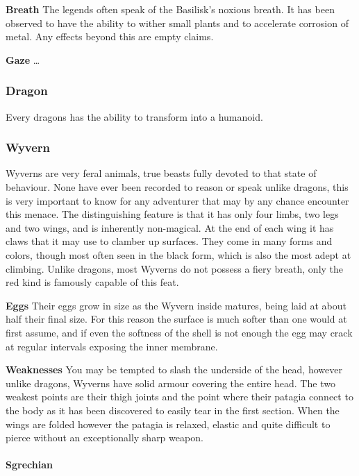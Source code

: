 \textbf{Breath} The legends often speak of the Basilisk's noxious
breath. It has been observed to have the ability to wither small plants
and to accelerate corrosion of metal. Any effects beyond this are empty
claims.

\textbf{Gaze} \ldots{}

\hypertarget{dragon}{%
\subsubsection{Dragon}\label{dragon}}

Every dragons has the ability to transform into a humanoid.

\hypertarget{wyvern}{%
\subsubsection{Wyvern}\label{wyvern}}

Wyverns are very feral animals, true beasts fully devoted to that state
of behaviour. None have ever been recorded to reason or speak unlike
dragons, this is very important to know for any adventurer that may by
any chance encounter this menace. The distinguishing feature is that it
has only four limbs, two legs and two wings, and is inherently
non-magical. At the end of each wing it has claws that it may use to
clamber up surfaces. They come in many forms and colors, though most
often seen in the black form, which is also the most adept at climbing.
Unlike dragons, most Wyverns do not possess a fiery breath, only the red
kind is famously capable of this feat.

\textbf{Eggs} Their eggs grow in size as the Wyvern inside matures,
being laid at about half their final size. For this reason the surface
is much softer than one would at first assume, and if even the softness
of the shell is not enough the egg may crack at regular intervals
exposing the inner membrane.

\textbf{Weaknesses} You may be tempted to slash the underside of the
head, however unlike dragons, Wyverns have solid armour covering the
entire head. The two weakest points are their thigh joints and the point
where their patagia connect to the body as it has been discovered to
easily tear in the first section. When the wings are folded however the
patagia is relaxed, elastic and quite difficult to pierce without an
exceptionally sharp weapon.

\hypertarget{sgrechian}{%
\paragraph{Sgrechian}\label{sgrechian}}

